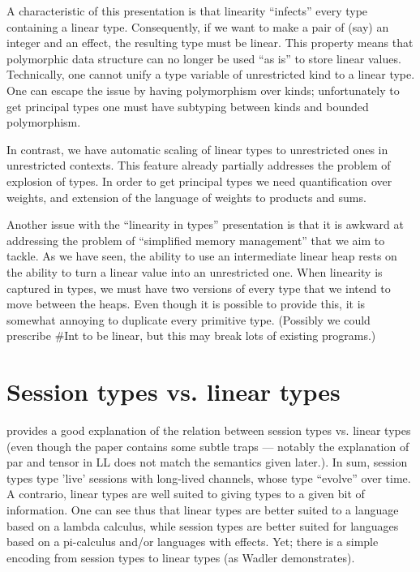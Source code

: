 \documentclass[11pt]{article}
\begin{document}
A characteristic of this presentation is that linearity ``infects''
every type containing a linear type. Consequently, if we want to make
a pair of (say) an integer and an effect, the resulting type must be
linear. This property means that polymorphic data structure can no
longer be used ``as is'' to store linear values. Technically, one
cannot unify a type variable of unrestricted kind to a linear
type. One can escape the issue by having polymorphism over kinds;
unfortunately to get principal types one must have subtyping between
kinds and bounded polymorphism.

In contrast, we have automatic scaling of linear types to unrestricted
ones in unrestricted contexts. This feature already partially
addresses the problem of explosion of types. In order to get principal
types we need quantification over weights, and extension of the
language of weights to products and sums.

Another issue with the ``linearity in types'' presentation is that it
is awkward at addressing the problem of ``simplified memory
management'' that we aim to tackle. As we have seen, the ability to
use an intermediate linear heap rests on the ability to turn a linear
value into an unrestricted one. When linearity is captured in types,
we must have two versions of every type that we intend to move between
the heaps. Even though it is possible to provide this, it is somewhat
annoying to duplicate every primitive type. (Possibly we could
prescribe \#Int to be linear, but this may break lots of existing
programs.)

\section{Session types vs. linear types}

 provides a good explanation of
the relation between session types vs. linear types (even though the
paper contains some subtle traps --- notably the explanation of par
and tensor in LL does not match the semantics given later.). In sum,
session types type 'live' sessions with long-lived channels, whose
type ``evolve'' over time. A contrario, linear types are well suited
to giving types to a given bit of information. One can see thus that
linear types are better suited to a language based on a lambda
calculus, while session types are better suited for languages based on
a pi-calculus and/or languages with effects. Yet; there is a simple
encoding from session types to linear types (as Wadler demonstrates).


\printbibliography
\end{document}
